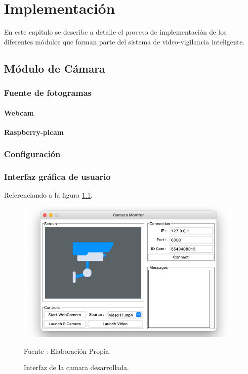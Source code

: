 \chapter{Implementación}
En este capitulo se describe a detalle el proceso de implementación de los diferentes módulos que forman parte del sistema  de video-vigilancia inteligente.

\section{Módulo de Cámara}

\subsection{Fuente de fotogramas}
\subsubsection{Webcam}
\subsubsection{Raspberry-picam}
\subsection{Configuración}
\subsection{Interfaz gráfica de usuario}

Referenciando a la figura \ref{fig:camera_screen}.
\begin{figure}[H]
    \begin{center}
        \includegraphics[width=13cm]{img/capitulo_5/camera_screen.png}
        \caption{Interfaz de la camara desarrollada.}
        Fuente : Elaboración Propia.
        \label{fig:camera_screen}
    \end{center}
\end{figure}

